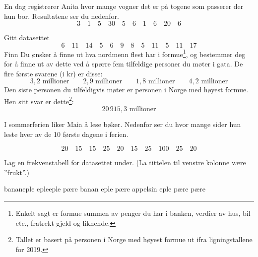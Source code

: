 En dag registrerer Anita hvor mange vogner det er på togene som passerer der hun
bor. Resultatene ser du nedenfor.
\[
3 \quad 1 \quad 5 \quad 30 \quad 5 \quad 6 \quad 1 \quad 6 \quad 20 \quad 6
\]

Gitt datasettet
\[ 6\quad11\quad 14\quad 5\quad 6\quad 9\quad 8\quad5\quad 11\quad 5\quad 11\quad 17 \]
Finn \os
{}
\newpage
{}
Du ønsker å finne ut hva nordmenn flest har i formue\footnote{Enkelt sagt er formue summen av penger du har i banken, verdier av hus, bil etc., fratrekt gjeld og liknende.}, og bestemmer deg for å finne ut av dette ved å spørre fem tilfeldige personer du møter i gata. De fire første svarene (i kr) er disse:
\[ 3,2\text{ millioner}\qquad 2,9\text{ millioner}\qquad 1,8\text{ millioner}\qquad 4,2\text{ millioner}  \]
Den siste personen du tilfeldigvis møter er personen i Norge med høyest formue. Hen sitt svar er dette\footnote{Tallet er basert på personen i Norge med høyest formue ut ifra ligningstallene for 2019.}:
\[ 20\,915,3\text{ millioner} \]

I sommerferien liker Maia å lese bøker. Nedenfor ser du hvor mange sider hun leste hver av de 10 første dagene i ferien.

\[
20 \quad 15 \quad 15 \quad 25 \quad 20 \quad 15 \quad 25 \quad 100 \quad 25 \quad 20
\]



Lag en frekvenstabell for datasettet under. (La tittelen til venstre kolonne være ''frukt''.)
\begin{center}
	banan\quad eple \quad eple\quad eple \quad pære \quad banan \quad eple \quad pære \quad appelsin \quad eple \quad pære \quad pære
\end{center}

